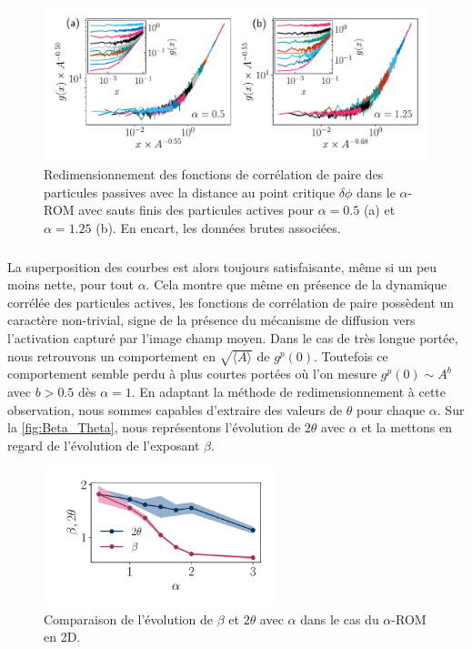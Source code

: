 \begin{figure}[h]
	\centering
	\includegraphics[width=\textwidth]{Chapitre3/Figures/Interpretation/PCorr_alpha.pdf}
	\caption{Redimensionnement des fonctions de corrélation de paire des particules passives avec la distance au point critique $\delta\phi$ dans le $\alpha$-ROM avec sauts finis des particules actives pour $\alpha = 0.5$ (a) et $\alpha=1.25$ (b). En encart, les données brutes associées. }
	\label{fig:PCorr_alpha}
\end{figure}

\subparagraph{}La superposition des courbes est alors toujours satisfaisante, même si un peu moins nette, pour tout $\alpha$. Cela montre que même en présence de la dynamique corrélée des particules actives, les fonctions de corrélation de paire possèdent un caractère non-trivial, signe de la présence du mécanisme de diffusion vers l'activation capturé par l'image champ moyen. Dans le cas de très longue portée, nous retrouvons un comportement en $\sqrt{\langle A \rangle}$ de $g^p(0)$. Toutefois ce comportement semble perdu à plus courtes portées où l'on mesure $g^p(0)\sim A^b$ avec $b>0.5$ dès $\alpha = 1$. En adaptant la méthode de redimensionnement à cette observation, nous sommes capables d'extraire des valeurs de $\theta$ pour chaque $\alpha$. Sur la \autoref{fig:Beta_Theta}, nous représentons l'évolution de $2\theta$ avec $\alpha$ et la mettons en regard de l'évolution de l'exposant $\beta$.

\begin{figure}[h]
	\centering
	\includegraphics[width=0.6\textwidth]{Chapitre3/Figures/Interpretation/Beta_Theta.pdf}
	\caption{Comparaison de l'évolution de $\beta$ et $2\theta$ avec $\alpha$ dans le cas du $\alpha$-ROM en 2D.}
	\label{fig:Beta_Theta}
\end{figure}

